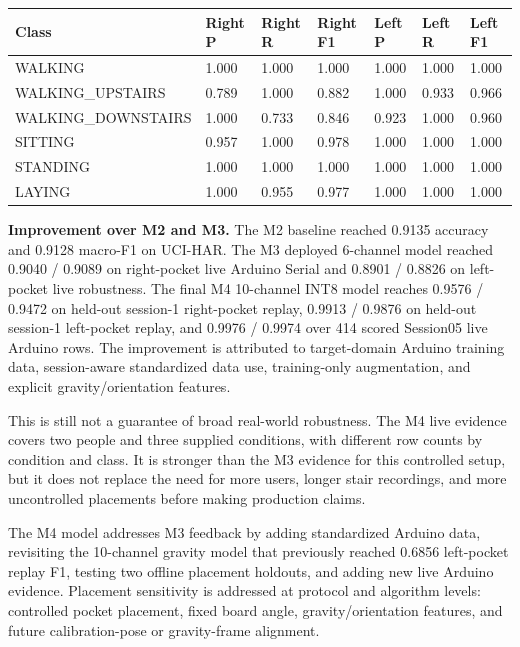 \documentclass[11pt,a4paper]{article}
\begin{document}
\begin{center}
\scriptsize
\begin{tabular}{|p{2.9cm}|p{1.5cm}|p{1.5cm}|p{1.5cm}|p{1.5cm}|p{1.5cm}|p{1.5cm}|}
\hline
\rowcolor{headergray}
\textbf{Class} & \textbf{Right P} & \textbf{Right R} & \textbf{Right F1} & \textbf{Left P} & \textbf{Left R} & \textbf{Left F1}\\
\hline
WALKING & 1.000 & 1.000 & 1.000 & 1.000 & 1.000 & 1.000\\
\hline
WALKING\_UPSTAIRS & 0.789 & 1.000 & 0.882 & 1.000 & 0.933 & 0.966\\
\hline
WALKING\_DOWNSTAIRS & 1.000 & 0.733 & 0.846 & 0.923 & 1.000 & 0.960\\
\hline
SITTING & 0.957 & 1.000 & 0.978 & 1.000 & 1.000 & 1.000\\
\hline
STANDING & 1.000 & 1.000 & 1.000 & 1.000 & 1.000 & 1.000\\
\hline
LAYING & 1.000 & 0.955 & 0.977 & 1.000 & 1.000 & 1.000\\
\hline
\end{tabular}
\end{center}
\normalsize

\textbf{Improvement over M2 and M3.} The M2 baseline reached 0.9135 accuracy and 0.9128 macro-F1 on UCI-HAR. The M3 deployed 6-channel model reached 0.9040 / 0.9089 on right-pocket live Arduino Serial and 0.8901 / 0.8826 on left-pocket live robustness. The final M4 10-channel INT8 model reaches 0.9576 / 0.9472 on held-out session-1 right-pocket replay, 0.9913 / 0.9876 on held-out session-1 left-pocket replay, and 0.9976 / 0.9974 over 414 scored Session05 live Arduino rows. The improvement is attributed to target-domain Arduino training data, session-aware standardized data use, training-only augmentation, and explicit gravity/orientation features.

This is still not a guarantee of broad real-world robustness. The M4 live evidence covers two people and three supplied conditions, with different row counts by condition and class. It is stronger than the M3 evidence for this controlled setup, but it does not replace the need for more users, longer stair recordings, and more uncontrolled placements before making production claims.

The M4 model addresses M3 feedback by adding standardized Arduino data, revisiting the 10-channel gravity model that previously reached 0.6856 left-pocket replay F1, testing two offline placement holdouts, and adding new live Arduino evidence. Placement sensitivity is addressed at protocol and algorithm levels: controlled pocket placement, fixed board angle, gravity/orientation features, and future calibration-pose or gravity-frame alignment.
\end{document}
